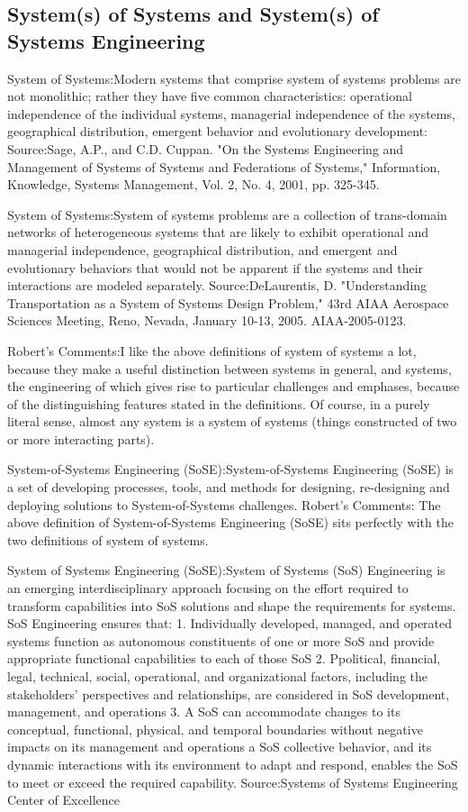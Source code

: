 \subsection{System(s) of Systems and System(s) of Systems Engineering}

System of Systems:Modern systems that comprise system of systems problems are not monolithic; rather they have five common characteristics: operational independence of the individual systems, managerial independence of the systems, geographical distribution, emergent behavior and evolutionary development:
Source:Sage, A.P., and C.D. Cuppan. "On the Systems Engineering and Management of Systems of Systems and Federations of Systems," Information, Knowledge, Systems Management, Vol. 2, No. 4, 2001, pp. 325-345.

System of Systems:System of systems problems are a collection of trans-domain networks of heterogeneous systems that are likely to exhibit operational and managerial independence, geographical distribution, and emergent and evolutionary behaviors that would not be apparent if the systems and their interactions are modeled separately.
Source:DeLaurentis, D. "Understanding Transportation as a System of Systems Design Problem," 43rd AIAA Aerospace Sciences Meeting, Reno, Nevada, January 10-13, 2005. AIAA-2005-0123.

Robert's Comments:I like the above definitions of system of systems a lot, because they make a useful distinction between systems in general, and systems, the engineering of which gives rise to particular challenges and emphases, because of the distinguishing features stated in the definitions. Of course, in a purely literal sense, almost any system is a system of systems (things constructed of two or more interacting parts).

System-of-Systems Engineering (SoSE):System-of-Systems Engineering (SoSE) is a set of developing processes, tools, and methods for designing, re-designing and deploying solutions to System-of-Systems challenges.
Robert's Comments: The above definition of System-of-Systems Engineering (SoSE) sits perfectly with the two definitions of system of systems.

System of Systems Engineering (SoSE):System of Systems (SoS) Engineering is an emerging interdisciplinary approach focusing on the effort required to transform capabilities into SoS solutions and shape the requirements for systems. SoS Engineering ensures that:
1. Individually developed, managed, and operated systems function as autonomous constituents of one or more SoS and provide appropriate functional capabilities to each of those SoS
2. Ppolitical, financial, legal, technical, social, operational, and organizational factors, including the stakeholders' perspectives and relationships, are considered in SoS development, management, and operations
3. A SoS can accommodate changes to its conceptual, functional, physical, and temporal boundaries without negative impacts on its management and operations
a SoS collective behavior, and its dynamic interactions with its environment to adapt and respond, enables the SoS to meet or exceed the required capability.
Source:Systems of Systems Engineering Center of Excellence

